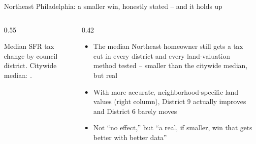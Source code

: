 \documentclass[aspectratio=169,11pt]{beamer}
\begin{document}
\begin{frame}{Northeast Philadelphia: a smaller win, honestly stated -- and it holds up}
\begin{columns}[T]
\begin{column}{0.55\linewidth}
\vspace{0.6em}

\vspace{0.8em}
{\footnotesize\color{deckmuted} Median SFR tax change by council district. Citywide median: \PhlCitywideDistrictMedianRefined{}.}
\end{column}
\begin{column}{0.42\linewidth}
\vspace{0.5em}
\small
\begin{itemize}
\item The median Northeast homeowner still gets a tax cut in every district and every land-valuation method tested -- smaller than the citywide median, but real
\item With more accurate, neighborhood-specific land values (right column), District 9 actually improves and District 6 barely moves
\item Not ``no effect,'' but ``a real, if smaller, win that gets better with better data''
\end{itemize}
\end{column}
\end{columns}
\end{frame}
\end{document}
